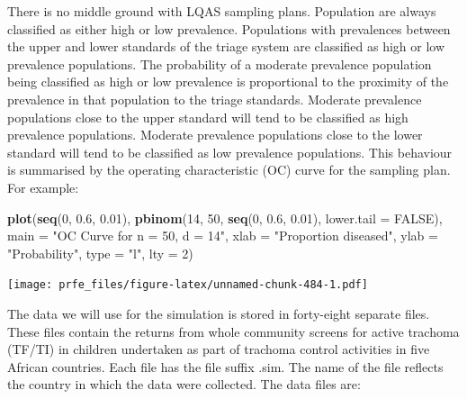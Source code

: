\documentclass[12pt,a4paper]{book}
\newenvironment{Shaded}{\begin{snugshade}}{\end{snugshade}}
\newcommand{\KeywordTok}[1]{\textcolor[rgb]{0.13,0.29,0.53}{\textbf{#1}}}
\newcommand{\DataTypeTok}[1]{\textcolor[rgb]{0.13,0.29,0.53}{#1}}
\newcommand{\DecValTok}[1]{\textcolor[rgb]{0.00,0.00,0.81}{#1}}
\newcommand{\FloatTok}[1]{\textcolor[rgb]{0.00,0.00,0.81}{#1}}
\newcommand{\StringTok}[1]{\textcolor[rgb]{0.31,0.60,0.02}{#1}}
\newcommand{\OtherTok}[1]{\textcolor[rgb]{0.56,0.35,0.01}{#1}}
\newcommand{\NormalTok}[1]{#1}
\theoremstyle{definition}
\theoremstyle{definition}
\theoremstyle{definition}
\theoremstyle{remark}
\begin{document}
There is no middle ground with LQAS sampling plans. Population are
always classified as either high or low prevalence. Populations with
prevalences between the upper and lower standards of the triage system
are classified as high or low prevalence populations. The probability of
a moderate prevalence population being classified as high or low
prevalence is proportional to the proximity of the prevalence in that
population to the triage standards. Moderate prevalence populations
close to the upper standard will tend to be classified as high
prevalence populations. Moderate prevalence populations close to the
lower standard will tend to be classified as low prevalence populations.
This behaviour is summarised by the operating characteristic (OC) curve
for the sampling plan. For example:

\begin{Shaded}
\begin{Highlighting}[]
\KeywordTok{plot}\NormalTok{(}\KeywordTok{seq}\NormalTok{(}\DecValTok{0}\NormalTok{, }\FloatTok{0.6}\NormalTok{, }\FloatTok{0.01}\NormalTok{),}
     \KeywordTok{pbinom}\NormalTok{(}\DecValTok{14}\NormalTok{, }\DecValTok{50}\NormalTok{, }\KeywordTok{seq}\NormalTok{(}\DecValTok{0}\NormalTok{, }\FloatTok{0.6}\NormalTok{, }\FloatTok{0.01}\NormalTok{), }\DataTypeTok{lower.tail =} \OtherTok{FALSE}\NormalTok{),}
     \DataTypeTok{main =} \StringTok{"OC Curve for n = 50, d = 14"}\NormalTok{,}
     \DataTypeTok{xlab =} \StringTok{"Proportion diseased"}\NormalTok{,}
     \DataTypeTok{ylab =} \StringTok{"Probability"}\NormalTok{,}
     \DataTypeTok{type =} \StringTok{"l"}\NormalTok{, }\DataTypeTok{lty =} \DecValTok{2}\NormalTok{)}
\end{Highlighting}
\end{Shaded}

\texttt{[image: prfe\_files/figure-latex/unnamed-chunk-484-1.pdf]}

The data we will use for the simulation is stored in forty-eight
separate files. These files contain the returns from whole community
screens for active trachoma (TF/TI) in children undertaken as part of
trachoma control activities in five African countries. Each file has the
file suffix .sim. The name of the file reflects the country in which the
data were collected. The data files are:
\end{document}
